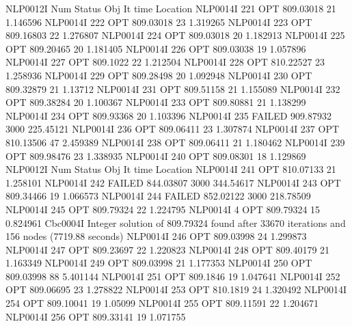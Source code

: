 NLP0012I 
              Num      Status      Obj             It       time                 Location
NLP0014I           221         OPT 809.03018       21 1.146596
NLP0014I           222         OPT 809.03018       23 1.319265
NLP0014I           223         OPT 809.16803       22 1.276807
NLP0014I           224         OPT 809.03018       20 1.182913
NLP0014I           225         OPT 809.20465       20 1.181405
NLP0014I           226         OPT 809.03038       19 1.057896
NLP0014I           227         OPT 809.1022       22 1.212504
NLP0014I           228         OPT 810.22527       23 1.258936
NLP0014I           229         OPT 809.28498       20 1.092948
NLP0014I           230         OPT 809.32879       21 1.13712
NLP0014I           231         OPT 809.51158       21 1.155089
NLP0014I           232         OPT 809.38284       20 1.100367
NLP0014I           233         OPT 809.80881       21 1.138299
NLP0014I           234         OPT 809.93368       20 1.103396
NLP0014I           235      FAILED 909.87932     3000 225.45121
NLP0014I           236         OPT 809.06411       23 1.307874
NLP0014I           237         OPT 810.13506       47 2.459389
NLP0014I           238         OPT 809.06411       21 1.180462
NLP0014I           239         OPT 809.98476       23 1.338935
NLP0014I           240         OPT 809.08301       18 1.129869
NLP0012I 
              Num      Status      Obj             It       time                 Location
NLP0014I           241         OPT 810.07133       21 1.258101
NLP0014I           242      FAILED 844.03807     3000 344.54617
NLP0014I           243         OPT 809.34466       19 1.066573
NLP0014I           244      FAILED 852.02122     3000 218.78509
NLP0014I           245         OPT 809.79324       22 1.224795
NLP0014I             4         OPT 809.79324       15 0.824961
Cbc0004I Integer solution of 809.79324 found after 33670 iterations and 156 nodes (7719.88 seconds)
NLP0014I           246         OPT 809.03998       24 1.299873
NLP0014I           247         OPT 809.23697       22 1.220823
NLP0014I           248         OPT 809.40179       21 1.163349
NLP0014I           249         OPT 809.03998       21 1.177353
NLP0014I           250         OPT 809.03998       88 5.401144
NLP0014I           251         OPT 809.1846       19 1.047641
NLP0014I           252         OPT 809.06695       23 1.278822
NLP0014I           253         OPT 810.1819       24 1.320492
NLP0014I           254         OPT 809.10041       19 1.05099
NLP0014I           255         OPT 809.11591       22 1.204671
NLP0014I           256         OPT 809.33141       19 1.071755
